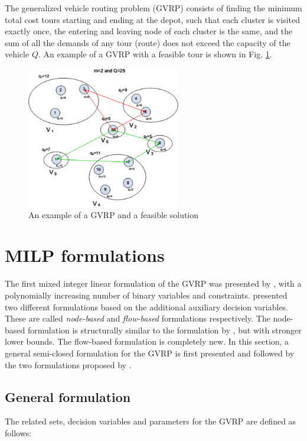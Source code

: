 \documentclass[letterpaper,12pt,onehalfspacing,twoside]{article}
\theoremstyle{msds}
\begin{document}
The generalized vehicle routing problem (GVRP) consists of finding the minimum total cost tours starting and ending at the depot, such that each cluster is visited exactly once, the entering and leaving node of each cluster is the same, and the sum of all the demands of any tour (route) does not exceed the capacity of the vehicle $Q$. An example of a GVRP with a feasible tour is shown in Fig. \ref {fig:example_gvrp}.

\begin{figure}[htbp]
\centering
\includegraphics[width=0.6\textwidth]{example_gvrp.png}
\caption{An example of a GVRP and a feasible solution \citep{POP201297}}
\label{fig:example_gvrp}
\end{figure}


\section{MILP formulations}
The first mixed integer linear formulation of the GVRP was presented by \cite{bektasKara}, with a polynomially increasing number of binary variables and constraints. \cite{POP201297} presented two different formulations based on the additional auxiliary decision variables. These are called \emph{node-based} and \emph{flow-based} formulations respectively. The node-based formulation is structurally similar to the formulation by \cite{bektasKara}, but with stronger lower bounds. The flow-based formulation is completely new. In this section, a general semi-closed formulation for the GVRP is first presented and followed by the two formulations proposed by \cite{POP201297}.

\subsection{General formulation}
The related sets, decision variables and parameters for the GVRP are defined as follows:
\end{document}
